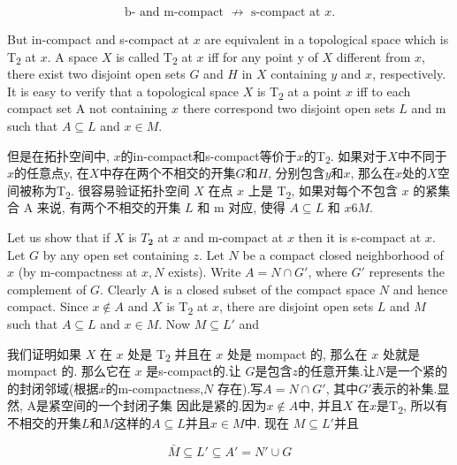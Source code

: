 \documentclass[options]{article}
\begin{document}
\[
		\text { b- and m-compact } \not\longrightarrow \text { s-compact at } x \text {. }
\]
\begin{paracol}{2}
	\begin{en}
		But in-compact and s-compact at $x$ are equivalent in a topological space which is T\textsubscript{\!$2$} at $x$. A space $X$ is called T\textsubscript{\!$2$} at $x$ iff for any point y of $X$ different from $x$, there exist two disjoint open sets $G$ and $H$ in $X$ containing $y$ and $x$, respectively. It is easy to verify that a topological space $X$ is T\textsubscript{\!$2$} at a point $x$ iff to each compact set A not containing $x$ there correspond two disjoint open sets $L$ and m such that $A \subseteq L$ and $x \in M$.
	\end{en}
	\begin{cn}
		但是在拓扑空间中, $x$的in-compact和s-compact等价于$x$的T\textsubscript{\!$2$}. 如果对于$X$中不同于$x$的任意点y, 在$X$中存在两个不相交的开集$G$和$H$, 分别包含$y$和$x$, 那么在$x$处的$X$空间被称为T\textsubscript{\!$2$}. 很容易验证拓扑空间 $X$ 在点 $x$ 上是 T\textsubscript{\!$2$}, 如果对每个不包含 $x$ 的紧集合 A 来说, 有两个不相交的开集 $ L$ 和 m 对应, 使得 $A \subseteq L$ 和 $x 6 M$.
	\end{cn}
	\begin{en}
		Let us show that if $X$ is $T_{\mathbf{2}}$ at $x$ and
		m-compact at $x$ then it is s-compact at $x$. Let
		$G$ by any open set containing $z$. Let $N$ be a compact
		closed neighborhood of $x$ (by m-compactness at $x, N$
		exists). Write $A=N \cap G'$, where $G'$ represents the
		complement of $G$. Clearly A is a closed subset of the compact space
		$N$ and hence compact. Since $x \notin A$ and $X$
		is T\textsubscript{\!$2$} at $x$, there are disjoint open sets $ L$
		and $M$ such that $A \subseteq  L$ and $x
		\in M$. Now $M \subseteq  L'$ and

	\end{en}
	\begin{cn}
		我们证明如果 $X$ 在 $x$ 处是 T\textsubscript{\!$2$} 并且在 $x$ 处是 mompact 的, 那么在 $x$ 处就是 mompact 的.
		那么它在 $x$ 是s-compact的.让
		$G$是包含$z$的任意开集.让$N$是一个紧的
		的封闭邻域(根据$x$的m-compactness,$N$
		存在).写$A=N\cap G'$, 其中$G'$表示的补集.显然, A是紧空间的一个封闭子集
		因此是紧的.因为$x\not\in A$中, 并且$X$	在$x$是T\textsubscript{$\!2$}, 所以有不相交的开集$L$和$M$这样的$A\subseteq L$并且$x
		\in M$中. 现在 $M \subseteq L'$并且
	\end{cn}
\end{paracol}
\[
		\bar{M} \subseteq L' \subseteq A'=N' \cup G
\]
\end{document}

